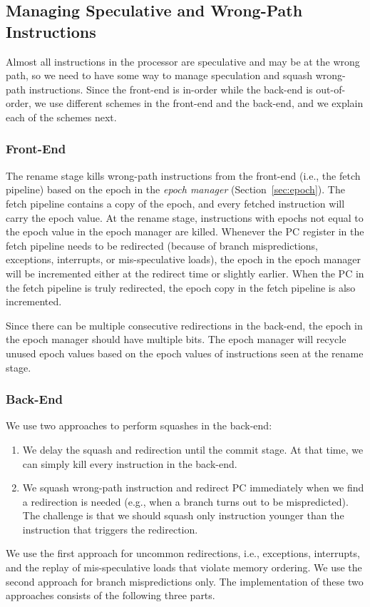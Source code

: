 \subsection{Managing Speculative and Wrong-Path Instructions}\label{sec:specupdate}

Almost all instructions in the processor are speculative and may be at the wrong path, so we need to have some way to manage speculation and squash wrong-path instructions.
Since the front-end is in-order while the back-end is out-of-order, we use different schemes in the front-end and the back-end, and we explain each of the schemes next.

\subsubsection{Front-End}
The rename stage kills wrong-path instructions from the front-end (i.e., the fetch pipeline) based on the epoch in the \emph{epoch manager} (Section~\ref{sec:epoch}).
The fetch pipeline contains a copy of the epoch, and every fetched instruction will carry the epoch value.
At the rename stage, instructions with epochs not equal to the epoch value in the epoch manager are killed.
Whenever the PC register in the fetch pipeline needs to be redirected (because of branch mispredictions, exceptions, interrupts, or mis-speculative loads), the epoch in the epoch manager will be incremented either at the redirect time or slightly earlier.
When the PC in the fetch pipeline is truly redirected, the epoch copy in the fetch pipeline is also incremented.

Since there can be multiple consecutive redirections in the back-end, the epoch in the epoch manager should have multiple bits.
The epoch manager will recycle unused epoch values based on the epoch values of instructions seen at the rename stage.

\subsubsection{Back-End}
We use two approaches to perform squashes in the back-end:
\begin{enumerate}
    \item We delay the squash and redirection until the commit stage.
    At that time, we can simply kill every instruction in the back-end.
    \item We squash wrong-path instruction and redirect PC immediately when we find a redirection is needed (e.g., when a branch turns out to be mispredicted).
    The challenge is that we should squash only instruction younger than the instruction that triggers the redirection.
\end{enumerate}
We use the first approach for uncommon redirections, i.e., exceptions, interrupts, and the replay of mis-speculative loads that violate memory ordering.
We use the second approach for branch mispredictions only.
The implementation of these two approaches consists of the following three parts.

